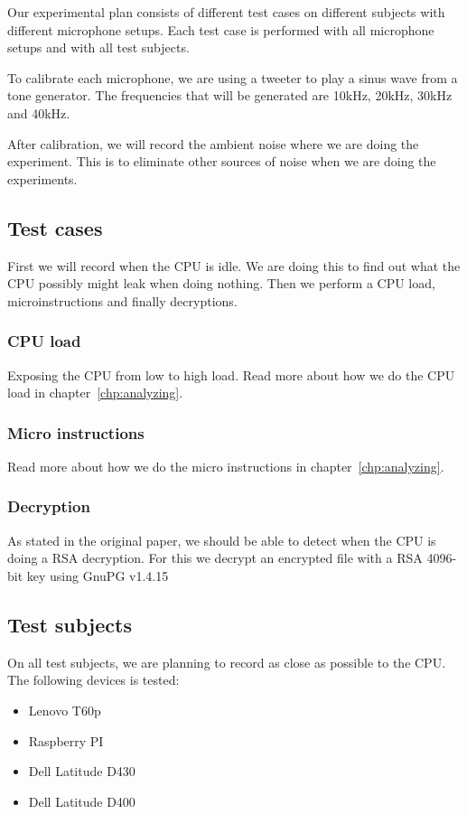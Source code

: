 Our experimental plan consists of different test cases on different subjects with different microphone setups. Each test case is performed with all microphone setups and with all test subjects. 

To calibrate each microphone, we are using a tweeter to play a sinus wave from a tone generator. 
The frequencies that will be generated are 10kHz, 20kHz, 30kHz and 40kHz.

After calibration, we will record the ambient noise where we are doing the experiment.
This is to eliminate other sources of noise when we are doing the experiments.

\subsection{Test cases}
First we will record when the CPU is idle. 
We are doing this to find out what the CPU possibly might leak when doing nothing. 
Then we perform a CPU load, microinstructions and finally decryptions.

\subsubsection{CPU load}
Exposing the CPU from low to high load.
Read more about how we do the CPU load in chapter~\ref{chp:analyzing}.

\subsubsection{Micro instructions}
Read more about how we do the micro instructions in chapter~\ref{chp:analyzing}.

\subsubsection{Decryption}
As stated in the original paper, we should be able to detect when the CPU is doing a RSA decryption. 
For this we decrypt an encrypted file with a RSA 4096-bit key using GnuPG v1.4.15~\cite{GnuPG_1.4.15}

\subsection{Test subjects}
On all test subjects, we are planning to record as close as possible to the CPU. 
The following devices is tested:

\begin{itemize}[topsep=-1em,parsep=0em,itemsep=0em]
 \item Lenovo T60p
 \item Raspberry PI
 \item Dell Latitude D430
 \item Dell Latitude D400
\end{itemize}

